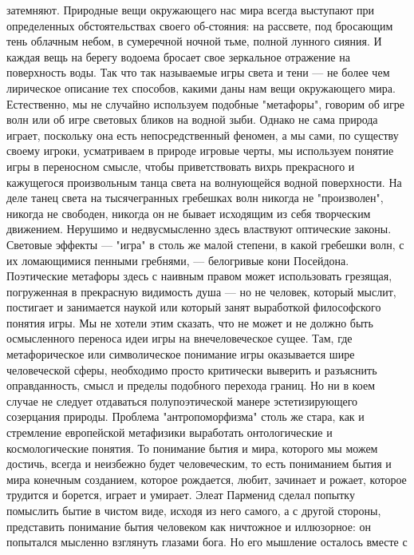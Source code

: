 \documentclass[12pt]{article}
\begin{document}
затемняют. Природные  вещи  окружающего нас мира  всегда выступают при  определенных обстоятельствах
своего об-стояния: на рассвете, под бросающим тень облачным небом, в сумеречной ночной тьме, полной
лунного сияния. И каждая вещь на берегу водоема бросает свое зеркальное отражение на поверхность воды. Так
что так называемые игры света и тени --- не более чем лирическое описание тех способов, какими даны нам
вещи окружающего мира. Естественно, мы не случайно используем подобные "метафоры", говорим об игре
волн  или  об  игре  световых  бликов  на  водной  зыби.  Однако  не  сама  природа  играет,  поскольку  она  есть
непосредственный феномен, а мы сами, по существу своему игроки, усматриваем в природе игровые черты, мы
используем  понятие  игры  в  переносном  смысле,  чтобы  приветствовать  вихрь  прекрасного  и  кажущегося
произвольным  танца  света  на  волнующейся  водной  поверхности.  На  деле  танец  света  на  тысячегранных
гребешках  волн  никогда  не  "произволен",  никогда  не  свободен,  никогда  он  не  бывает  исходящим  из  себя
творческим движением. Нерушимо и недвусмысленно здесь властвуют оптические законы. Световые эффекты
---  "игра"  в  столь  же  малой  степени,  в  какой  гребешки  волн,  с  их  ломающимися  пенными  гребнями,  ---  
белогривые кони Посейдона. Поэтические метафоры здесь с наивным правом может использовать грезящая,
погруженная в прекрасную видимость душа --- но не человек, который мыслит, постигает и занимается наукой
или который занят выработкой философского понятия игры. Мы не хотели этим сказать, что не может и не
должно  быть  осмысленного  переноса  идеи  игры  на  внечеловеческое  сущее.  Там,  где  метафорическое  или
символическое  понимание  игры  оказывается  шире  человеческой  сферы,  необходимо  просто  критически
выверить и разъяснить оправданность, смысл и пределы подобного перехода границ. Но ни в коем случае не
следует  отдаваться  полупоэтической  манере  эстетизирующего  созерцания  природы.  Проблема
"антропоморфизма" столь же стара, как и стремление европейской метафизики выработать онтологические и
космологические понятия. То понимание бытия и мира, которого мы можем достичь, всегда и неизбежно будет
человеческим, то есть пониманием бытия и мира конечным созданием, которое рождается, любит, зачинает и
рожает, которое трудится и борется, играет и умирает. Элеат Парменид сделал попытку помыслить бытие в
чистом  виде,  исходя  из  него  самого,  а  с  другой  стороны,  представить  понимание  бытия  человеком  как
ничтожное и иллюзорное: он попытался мысленно взглянуть глазами бога. Но его мышление осталось вместе с
\end{document}
